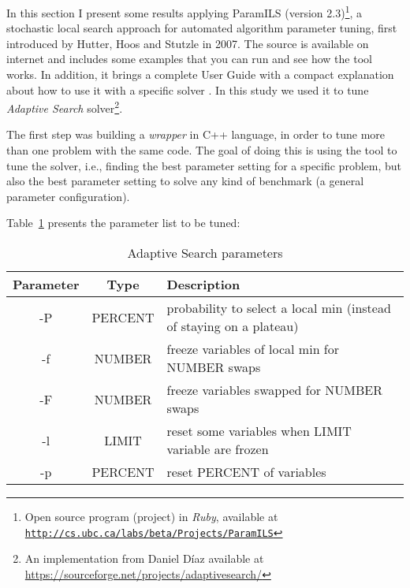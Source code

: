 


In this section I present some results applying {\sc ParamILS} (version 2.3)\footnote{Open source program (project) in {\it Ruby}, available at \href{http://cs.ubc.ca/labs/beta/Projects/ParamILS}{\texttt{http://cs.ubc.ca/labs/beta/Projects/ParamILS}}}, a stochastic local search approach for automated algorithm parameter tuning, first introduced by Hutter, Hoos and St\:utzle in 2007. The source is available on internet and includes some examples that you can run and see how the tool works. In addition, it brings a complete User Guide with a compact explanation about how to use it with a specific solver \cite{Hutter2008,Hutter2009}. In this study we used it to tune {\it Adaptive Search} solver\footnote{An implementation from Daniel D\'{i}az available at \href{https://sourceforge.net/projects/adaptivesearch/}{https://sourceforge.net/projects/adaptivesearch/}}. %

The first step was building a {\it wrapper} in C++ language, in order to tune more than one problem with the same code. The goal of doing this is using the tool to tune the solver, i.e., finding the best parameter setting for a specific problem, but also the best parameter setting to solve any kind of benchmark (a general parameter configuration).

\nocite{Rickard}

Table~\ref{table:param} presents the parameter list to be tuned:

\begin{table}[ht] 
\centering 
\begin{tabular}{c c l}
\hline\hline
Parameter & Type & Description \\ [0.5ex]
\hline
-P & PERCENT & probability to select a local min (instead of staying on a plateau) \\
-f & NUMBER & freeze variables of local min for NUMBER swaps \\ 
-F & NUMBER & freeze variables swapped for NUMBER swaps \\ 
-l & LIMIT & reset some variables when LIMIT variable are frozen \\ 
-p & PERCENT & reset PERCENT of variables \\ [1ex]
\hline
\end{tabular} 
\caption{Adaptive Search parameters}
\label{table:param}
\end{table} 

